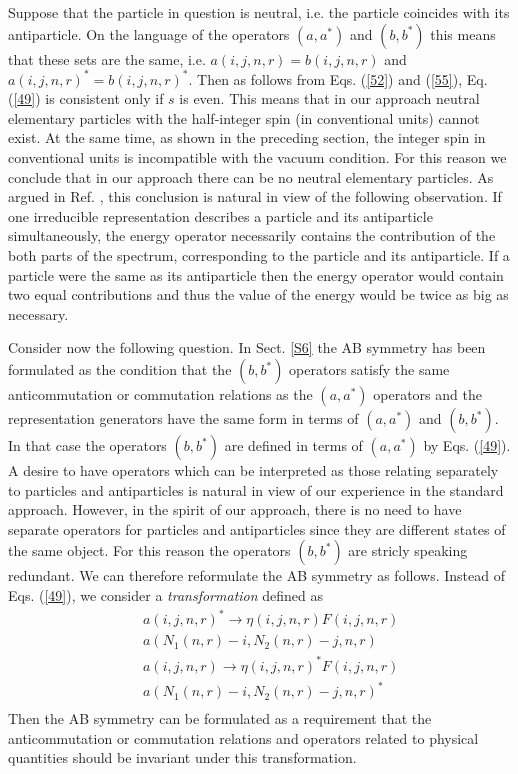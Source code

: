 \documentclass[a4paper,12pt]{article}%
\begin{document}
Suppose that the particle in question is neutral, i.e.
the particle coincides with its antiparticle. On the language
of the operators $(a,a^*)$ and $(b,b^*)$ this means that these
sets are the same, i.e. $a(i,j,n,r)=b(i,j,n,r)$ and
$a(i,j,n,r)^*=b(i,j,n,r)^*$. Then as follows from
Eqs. (\ref{52}) and (\ref{55}), Eq. (\ref{49}) is
consistent only if $s$ is even. This means that in 
our approach neutral elementary particles with
the half-integer spin (in conventional units) cannot
exist. At the same time, as shown in the preceding section,
the integer spin in conventional units is incompatible
with the vacuum condition. For this reason we conclude
that in our approach there can be no neutral elementary
particles. As argued in Ref. \cite{lev2}, this conclusion
is natural in view of the following observation. 
If one irreducible representation describes a 
particle and its antiparticle simultaneously, the energy 
operator necessarily contains the contribution of
the both parts of the spectrum, corresponding to the particle
and its antiparticle. If a particle were the same as 
its antiparticle then the energy operator would 
contain two equal contributions and thus the value of 
the energy would be twice as big as necessary. 

Consider now the following question.
In Sect. \ref{S6} the AB symmetry has been formulated as the
condition that the $(b,b^*)$ operators satisfy the same
anticommutation or commutation relations as the
$(a,a^*)$ operators and the representation generators
have the same form
in terms of $(a,a^*)$ and $(b,b^*)$. 
In that case the operators
$(b,b^*)$ are defined in terms of $(a,a^*)$ by 
Eqs. (\ref{49}). A desire to have operators which can be
interpreted as those relating separately 
to particles and antiparticles is natural in view of our
experience in the standard approach. However, in the spirit
of our approach, there is no need to have separate 
operators for
particles and antiparticles since they are different states
of the same object. For this reason the operators $(b,b^*)$
are stricly speaking redundant. We can therefore reformulate
the AB symmetry as follows. Instead of Eqs. (\ref{49}), 
we consider a {\it transformation} defined as 
\begin{eqnarray}
&&a(i,j,n,r)^*\rightarrow\eta(i,j,n,r) F(i,j,n,r)\nonumber\\
&&a(N_1(n,r)-i,N_2(n,r)-j,n,r)\nonumber\\ 
&&a(i,j,n,r)\rightarrow\eta(i,j,n,r)^* F(i,j,n,r)\nonumber\\
&&a(N_1(n,r)-i,N_2(n,r)-j,n,r)^*\nonumber\\ 
\label{62}
\end{eqnarray}
Then the AB symmetry can be formulated as a requirement that
the anticommutation or commutation relations and operators 
related to physical quantities should be invariant
under this transformation.
\end{document}
